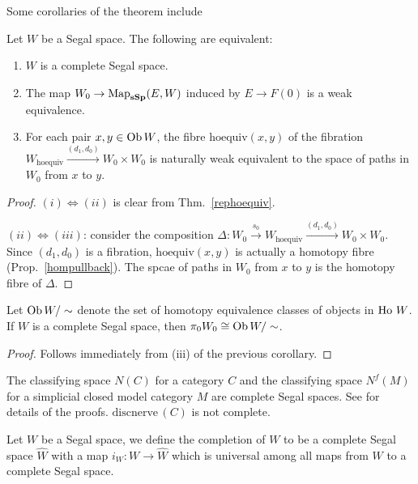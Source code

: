 \begin{refsection}
Some corollaries of the theorem include
\begin{cor}\label{rephoequivcor}
Let $W$ be a Segal space. The following are equivalent:
\begin{enumerate}
\item $W$ is a complete Segal space.
\item The map $W_0\to\operatorname{\mathrm{Map}}_{\mathbf{sSp}}(E,W)$ induced by $E\to F(0)$ is a weak equivalence.
\item For each pair $x,y\in\operatorname{Ob} W$, the fibre $\mathrm{hoequiv}(x,y)$ of the fibration $W_{\mathrm{hoequiv}}\xrightarrow{(d_1,d_0)} W_0\times W_0$ is naturally weak equivalent to the space of paths in $W_0$ from $x$ to $y$.
\end{enumerate}
\end{cor}
\begin{proof}
$(i)\Leftrightarrow(ii)$ is clear from Thm.~\ref{rephoequiv}.

$(ii)\Leftrightarrow(iii)$: consider the composition $\Delta:W_0\xrightarrow{s_0}W_{\mathrm{hoequiv}}\xrightarrow{(d_1,d_0)} W_0\times W_0$. Since $(d_1,d_0)$ is a fibration, $\mathrm{hoequiv}(x,y)$ is actually a homotopy fibre (Prop.~\ref{hompullback}). The spcae of paths in $W_0$ from $x$ to $y$ is the homotopy fibre of $\Delta$.
\end{proof}

\begin{cor}
Let $\operatorname{Ob} W/\sim$ denote the set of homotopy equivalence classes of objects in $\operatorname{\mathrm{Ho} \,} W$. If $W$ is a complete Segal space, then $\pi_0W_0\cong\operatorname{Ob} W/\sim$.
\end{cor}
\begin{proof}
Follows immediately from (iii) of the previous corollary.
\end{proof}

\begin{eg}
The classifying space $N(C)$ for a category $C$ and the classifying space $N^f(M)$ for a simplicial closed model category $M$ are complete Segal spaces. See \cite{rezk} for details of the proofs. $\mathrm{discnerve}\,(C)$ is not complete.
\end{eg}

\begin{defin}
Let $W$ be a Segal space, we define the completion of $W$ to be a complete Segal space $\hat W$ with a map $i_W:W\to\hat W$ which is universal among all maps from $W$ to a complete Segal space.
\end{defin}


\end{refsection}
